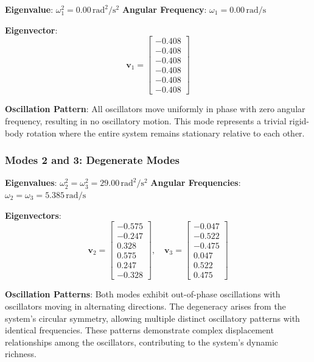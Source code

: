 \documentclass[12pt]{report} %
\begin{document}
\textbf{Eigenvalue}: \( \omega_1^2 = 0.00 \, \text{rad}^2/\text{s}^2 \)  
\textbf{Angular Frequency}: \( \omega_1 = 0.00 \, \text{rad/s} \)

\textbf{Eigenvector}:
\[
\mathbf{v}_1 = \begin{bmatrix}
-0.408 \\
-0.408 \\
-0.408 \\
-0.408 \\
-0.408 \\
-0.408
\end{bmatrix}
\]

\textbf{Oscillation Pattern}:  
All oscillators move uniformly in phase with zero angular frequency, resulting in no oscillatory motion. This mode represents a trivial rigid-body rotation where the entire system remains stationary relative to each other.

\subsubsection{Modes 2 and 3: Degenerate Modes}
\label{subsubsec:part4_modes2_3}

\textbf{Eigenvalues}: \( \omega_2^2 = \omega_3^2 = 29.00 \, \text{rad}^2/\text{s}^2 \)  
\textbf{Angular Frequencies}: \( \omega_2 = \omega_3 = 5.385 \, \text{rad/s} \)

\textbf{Eigenvectors}:
\[
\mathbf{v}_2 = \begin{bmatrix}
-0.575 \\
-0.247 \\
0.328 \\
0.575 \\
0.247 \\
-0.328
\end{bmatrix},
\quad
\mathbf{v}_3 = \begin{bmatrix}
-0.047 \\
-0.522 \\
-0.475 \\
0.047 \\
0.522 \\
0.475
\end{bmatrix}
\]

\textbf{Oscillation Patterns}:  
Both modes exhibit out-of-phase oscillations with oscillators moving in alternating directions. The degeneracy arises from the system's circular symmetry, allowing multiple distinct oscillatory patterns with identical frequencies. These patterns demonstrate complex displacement relationships among the oscillators, contributing to the system's dynamic richness.
\end{document}
